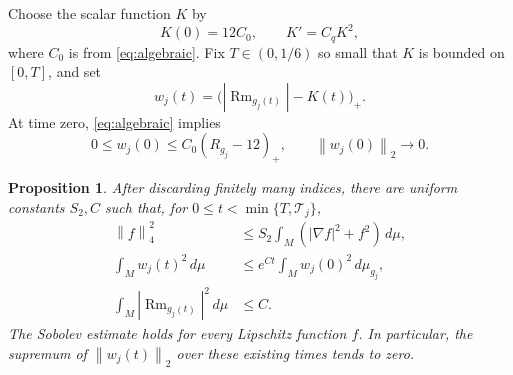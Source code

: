\documentclass[11pt]{article}
\newtheorem{proposition}[theorem]{Proposition}
\theoremstyle{definition}
\theoremstyle{remark}
\numberwithin{equation}{section}
\DeclareMathOperator{\Rm}{Rm}
\newcommand{\dd}{\,d\mu}
\newcommand{\norm}[1]{\left\lVert #1\right\rVert}
\begin{document}
Choose the scalar function $K$ by
\begin{equation}\label{eq:threshold}
 K(0)=12C_0,\qquad K'=C_qK^2,
\end{equation}
where $C_0$ is from \eqref{eq:algebraic}. Fix $T\in(0,1/6)$ so small
that $K$ is bounded on $[0,T]$, and set
\[
 w_j(t)=\bigl(|\Rm_{g_j(t)}|-K(t)\bigr)_+.
\]
At time zero, \eqref{eq:algebraic} implies
\begin{equation}\label{eq:initial-tail}
 0\le w_j(0)\le C_0(R_{g_j}-12)_+,\qquad
 \norm{w_j(0)}_2\longrightarrow0.
\end{equation}

\begin{proposition}\label{prop:tail}
After discarding finitely many indices, there are uniform constants
$S_2,C$ such that, for $0\le t<\min\{T,\mathcal T_j\}$,
\begin{align}
 \norm f_4^2&\le S_2\int_M(|\nabla f|^2+f^2)\dd,
       \label{eq:flow-sobolev}\\
 \int_M w_j(t)^2\dd&\le e^{Ct}\int_M w_j(0)^2\,d\mu_{g_j},
       \label{eq:tail-propagation}\\
 \int_M|\Rm_{g_j(t)}|^2\dd&\le C.
       \label{eq:curvature-energy}
\end{align}
The Sobolev estimate holds for every Lipschitz function $f$.
In particular, the supremum of $\norm{w_j(t)}_2$ over these existing
times tends to zero.
\end{proposition}
\end{document}
